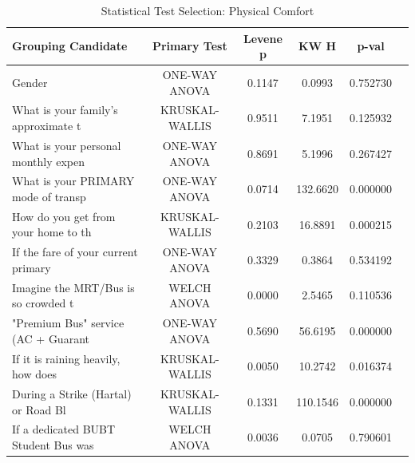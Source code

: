 \begin{table}[htbp]
\centering
\caption{Statistical Test Selection: Physical Comfort}
\label{tab:analysis_05_likert_comfort_safety}
\begin{tabular}{lccccc}
\hline
\textbf{Grouping Candidate} & \textbf{Primary Test} & \textbf{Levene p} & \textbf{KW H} & \textbf{p-val} \\
\hline
Gender & ONE-WAY ANOVA & 0.1147 & 0.0993 & 0.752730 \\
What is your family's approximate t & KRUSKAL-WALLIS & 0.9511 & 7.1951 & 0.125932 \\
What is your personal monthly expen & ONE-WAY ANOVA & 0.8691 & 5.1996 & 0.267427 \\
What is your PRIMARY mode of transp & ONE-WAY ANOVA & 0.0714 & 132.6620 & 0.000000 \\
How do you get from your home to th & KRUSKAL-WALLIS & 0.2103 & 16.8891 & 0.000215 \\
If the fare of your current primary & ONE-WAY ANOVA & 0.3329 & 0.3864 & 0.534192 \\
Imagine the MRT/Bus is so crowded t & WELCH ANOVA & 0.0000 & 2.5465 & 0.110536 \\
"Premium Bus" service (AC + Guarant & ONE-WAY ANOVA & 0.5690 & 56.6195 & 0.000000 \\
If it is raining heavily, how does  & KRUSKAL-WALLIS & 0.0050 & 10.2742 & 0.016374 \\
During a Strike (Hartal) or Road Bl & KRUSKAL-WALLIS & 0.1331 & 110.1546 & 0.000000 \\
If a dedicated BUBT Student Bus was & WELCH ANOVA & 0.0036 & 0.0705 & 0.790601 \\
\hline
\end{tabular}
\end{table}
